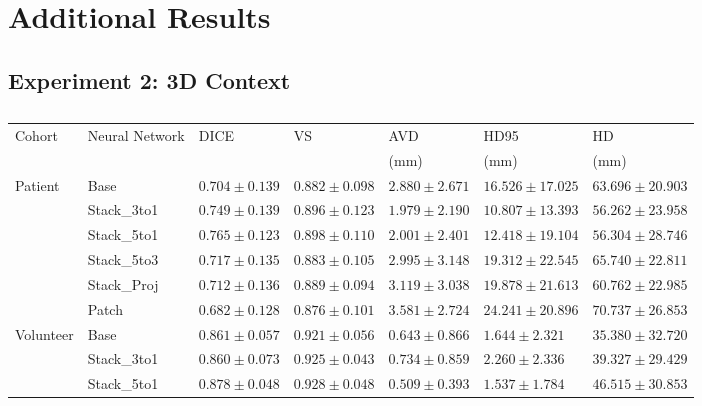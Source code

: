 \chapter{Additional Results} \label{app:results}

\section{Experiment 2: 3D Context} %

\begin{sidewaystable}[htbp]
   \centering
   \caption[Detailed Results for 3D Context]{}
   \begin{tabular}{l*{6}{l}}
      \toprule
      Cohort	& Neural Network	& DICE				& VS				& AVD				& HD95				& HD				\\
      			&					&					&					& (mm)				& (mm)				& (mm)				\\
      \midrule
      Patient   & Base  & $0.704 \pm 0.139$ & $0.882 \pm 0.098$ & $2.880 \pm 2.671$ & $16.526 \pm 17.025$ & $63.696 \pm 20.903$ \\
                & Stack\_3to1  & $0.749 \pm 0.139$ & $0.896 \pm 0.123$ & $\mathbf{1.979 \pm 2.190}$ & $\mathbf{10.807 \pm 13.393}$ & $\mathbf{56.262 \pm 23.958}$ \\
                & Stack\_5to1  & $\mathbf{0.765 \pm 0.123}$ & $\mathbf{0.898 \pm 0.110}$ & $2.001 \pm 2.401$ & $12.418 \pm 19.104$ & $56.304 \pm 28.746$ \\
                & Stack\_5to3  & $0.717 \pm 0.135$ & $0.883 \pm 0.105$ & $2.995 \pm 3.148$ & $19.312 \pm 22.545$ & $65.740 \pm 22.811$ \\
                & Stack\_Proj  & $0.712 \pm 0.136$ & $0.889 \pm 0.094$ & $3.119 \pm 3.038$ & $19.878 \pm 21.613$ & $60.762 \pm 22.985$ \\
                & Patch & $0.682 \pm 0.128$ & $0.876 \pm 0.101$ & $3.581 \pm 2.724$ & $24.241 \pm 20.896$ & $70.737 \pm 26.853$ \\                
      \midrule
      Volunteer & Base  & $0.861 \pm 0.057$ & $0.921 \pm 0.056$ & $0.643 \pm 0.866$ & $1.644  \pm 2.321 $ & $\mathbf{35.380 \pm 32.720}$ \\
                & Stack\_3to1  & $0.860 \pm 0.073$ & $0.925 \pm 0.043$ & $0.734 \pm 0.859$ & $2.260  \pm 2.336 $ & $39.327 \pm 29.429$ \\
                & Stack\_5to1  & $\mathbf{0.878 \pm 0.048}$ & $\mathbf{0.928 \pm 0.048}$ & $ 0.509 \pm 0.393	$ & $1.537  \pm 1.784 $ & $46.515 \pm 30.853$ \\

\end{tabular}
\end{sidewaystable}
